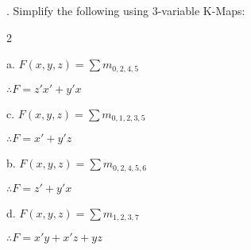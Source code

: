 \documentclass[12pt]{book}
\newenvironment{indented}[1] {
	\begin{list}{}{\setlength{\leftmargin}{#1}}
		\item[]
	}{\end{list}}
\begin{document}
	. Simplify the following using 3-variable K-Maps:
	\begin{multicols}{2}
		\begin{indented}{5mm}
			a. $F(x, y, z) = \sum m_{0, 2, 4, 5}$
			\begin{indented}{5mm}
				\begin{karnaugh-map}[4][2][1][yz][x]

				\end{karnaugh-map}

				$\therefore F = z'x' + y'x$
			\end{indented}

			c. $F(x, y, z) = \sum m_{0, 1, 2, 3, 5}$
			\begin{indented}{5mm}
				\begin{karnaugh-map}[4][2][1][yz][x]
	
				\end{karnaugh-map}
	
				$\therefore F = x' + y'z$
			\end{indented}
		\end{indented}
		\columnbreak
		\begin{indented}{5mm}
			\pagebreak
			b. $F(x, y, z) = \sum m_{0, 2, 4, 5, 6}$
			\begin{indented}{5mm}
				\begin{karnaugh-map}[4][2][1][yz][x]
	
				\end{karnaugh-map}
	
				$\therefore F = z' + y'x$
			\end{indented}

			d. $F(x, y, z) = \sum m_{1, 2, 3, 7}$
			\begin{indented}{5mm}
				\begin{karnaugh-map}[4][2][1][yz][x]

				\end{karnaugh-map}

				$\therefore F = x'y + x'z + yz$
			\end{indented}
		\end{indented}
	\end{multicols}
\end{document}
